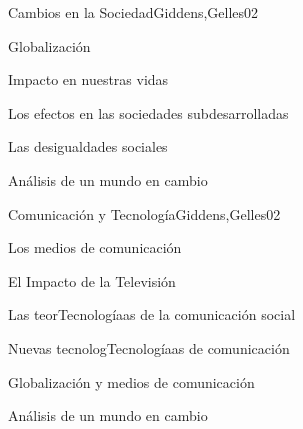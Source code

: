 \begin{syllabus}
\begin{unit}{Cambios en la Sociedad}{Giddens,Gelles}{0}{2}
    \begin{topics}
      \item Globalización
      \item Impacto en nuestras vidas
      \item Los efectos en las sociedades subdesarrolladas
      \item Las desigualdades sociales
    \end{topics}
    \begin{unitgoals}
      \item Análisis de un mundo en cambio
    \end{unitgoals}
\end{unit}

\begin{unit}{Comunicación y Tecnología}{Giddens,Gelles}{0}{2}
    \begin{topics}
      \item Los medios de comunicación
      \item El Impacto de la Televisión
      \item Las teorTecnologíaas de la comunicación social
      \item Nuevas tecnologTecnologíaas de comunicación
      \item Globalización y medios de comunicación
    \end{topics}
    \begin{unitgoals}
      \item Análisis de un mundo en cambio
    \end{unitgoals}
\end{unit}



\begin{coursebibliography}
\end{coursebibliography}

\end{syllabus}
